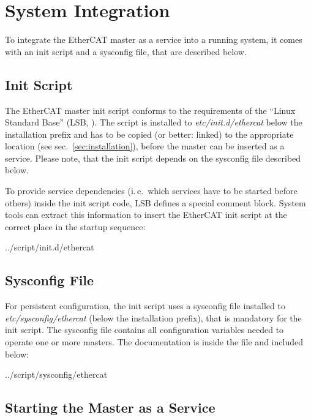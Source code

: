 \documentclass[a4paper,12pt,BCOR6mm,bibtotoc,idxtotoc]{scrbook}
\begin{document}

\section{System Integration}
\label{sec:system}

To integrate the EtherCAT master as a service into a running system, it comes
with an init script and a sysconfig file, that are described below.

\subsection{Init Script}
\label{sec:init}

The EtherCAT master init script conforms to the requirements of the ``Linux
Standard Base'' (LSB, \cite{lsb}). The script is installed to
\textit{etc/init.d/ethercat} below the installation prefix and has to be
copied (or better: linked) to the appropriate location (see
sec.~\ref{sec:installation}), before the master can be inserted as a service.
Please note, that the init script depends on the sysconfig file described
below.

To provide service dependencies (i.\,e.\ which services have to be started
before others) inside the init script code, LSB defines a special comment
block. System tools can extract this information to insert the EtherCAT init
script at the correct place in the startup sequence:


    {../script/init.d/ethercat}

\subsection{Sysconfig File}
\label{sec:sysconfig}

For persistent configuration, the init script uses a sysconfig file installed
to \textit{etc/sysconfig/ethercat} (below the installation prefix), that is
mandatory for the init script. The sysconfig file contains all configuration
variables needed to operate one or more masters. The documentation is inside
the file and included below:


    {../script/sysconfig/ethercat}

\subsection{Starting the Master as a Service}
\label{sec:service}
\end{document}
